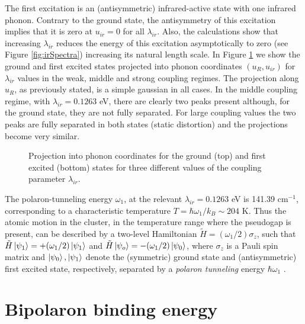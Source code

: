 The first excitation is an (antisymmetric) infrared-active state with one infrared phonon.
Contrary to the ground state, the antisymmetry of this excitation implies that it is zero at $u_{ir}=0$ for all $\lambda_{ir}$.
Also, the calculations show that increasing $\lambda_{ir}$ reduces the energy of this excitation asymptotically to zero (see Figure \ref{fig:irSpectra}) increasing its natural length scale. 
In Figure \ref{fig:phononProjGrdPol} we show the ground and first excited states projected into phonon coordinates $(u_R,u_{ir})$ for $\lambda_{ir}$ values in the weak, middle and strong coupling regimes.
The projection along $u_R$, as previously stated, is a simple gaussian in all cases.
In the middle coupling regime, with $\lambda_{ir}=0.1263$ eV, there are clearly two peaks present although, for the ground state, they are not fully separated.
For large coupling values the two peaks are fully separated in both states (static distortion) and the projections become very similar.

\begin{figure}[ht]
  \centering
  
  \caption[Ground and first excited states projected into phonon coordinates.]
  {Projection into phonon coordinates for the ground (top) and first excited (bottom) states for three different values of the coupling parameter $\lambda_{ir}$.}
  \label{fig:phononProjGrdPol}
\end{figure}

The polaron-tunneling energy $\omega_1$, at the relevant $\lambda_{ir}=0.1263$ eV is 141.39 cm$^{-1}$, corresponding to a characteristic temperature $T=\hbar\omega_1 / k_B \sim 204$ K.
Thus the atomic motion in the cluster, in the temperature range where the pseudogap is present, can be described by a two-level Hamiltonian $\tilde{H}=(\omega_1/2)\sigma_z$,  such that $\tilde{H}\left | \psi_1 \right\rangle=+(\omega_1/2)\left | \psi_1 \right\rangle$ and $\tilde{H}\left | \psi_o \right\rangle=-(\omega_1/2)\left | \psi_0 \right\rangle$, where $\sigma_z$ is a Pauli spin matrix and $\left | \psi_0 \right\rangle,\left | \psi_1 \right\rangle$ denote the (symmetric) ground state and (antisymmetric) first excited state, respectively, separated by a \textit{polaron tunneling} energy $\hbar\omega_1$ \cite{MustredeLeon1990}.


\section{Bipolaron binding energy}
\label{sec:PolBindingEnergy}


